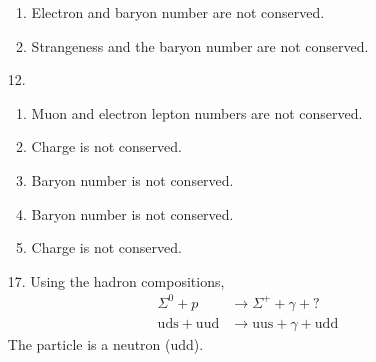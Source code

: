 \documentclass{homework}
\begin{document}
\begin{enumerate}
\begin{enumerate}
			\item Electron and baryon number are not conserved.
			\item Strangeness and the baryon number are not conserved.
		\end{enumerate}
		\item[12.] \begin{enumerate}
			\item Muon and electron lepton numbers are not conserved.
			\item Charge is not conserved.
			\item Baryon number is not conserved.
			\item Baryon number is not conserved.
			\item Charge is not conserved.
		\end{enumerate}
		\item[17.] Using the hadron compositions, \begin{align*}
			\Sigma^0 + p & \to \Sigma^+ + \gamma + ? \\
			\mathrm{uds} + \mathrm{uud} & \to \mathrm{uus} + \gamma + \boxed{\mathrm{udd}}
		\end{align*}
		The particle is a neutron (udd).
		

\end{enumerate}
\end{document}
